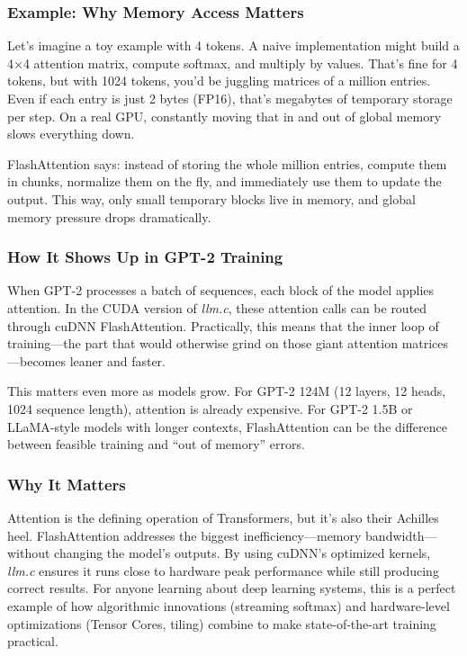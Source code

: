 \documentclass[
  letterpaper,
  DIV=11,
  numbers=noendperiod]{scrreprt}
\begin{document}
\subsubsection{Example: Why Memory Access
Matters}\label{example-why-memory-access-matters}

Let's imagine a toy example with 4 tokens. A naive implementation might
build a 4×4 attention matrix, compute softmax, and multiply by values.
That's fine for 4 tokens, but with 1024 tokens, you'd be juggling
matrices of a million entries. Even if each entry is just 2 bytes
(FP16), that's megabytes of temporary storage per step. On a real GPU,
constantly moving that in and out of global memory slows everything
down.

FlashAttention says: instead of storing the whole million entries,
compute them in chunks, normalize them on the fly, and immediately use
them to update the output. This way, only small temporary blocks live in
memory, and global memory pressure drops dramatically.

\subsubsection{How It Shows Up in GPT-2
Training}\label{how-it-shows-up-in-gpt-2-training}

When GPT-2 processes a batch of sequences, each block of the model
applies attention. In the CUDA version of \emph{llm.c}, these attention
calls can be routed through cuDNN FlashAttention. Practically, this
means that the inner loop of training---the part that would otherwise
grind on those giant attention matrices---becomes leaner and faster.

This matters even more as models grow. For GPT-2 124M (12 layers, 12
heads, 1024 sequence length), attention is already expensive. For GPT-2
1.5B or LLaMA-style models with longer contexts, FlashAttention can be
the difference between feasible training and ``out of memory'' errors.

\subsubsection{Why It Matters}\label{why-it-matters-39}

Attention is the defining operation of Transformers, but it's also their
Achilles heel. FlashAttention addresses the biggest
inefficiency---memory bandwidth---without changing the model's outputs.
By using cuDNN's optimized kernels, \emph{llm.c} ensures it runs close
to hardware peak performance while still producing correct results. For
anyone learning about deep learning systems, this is a perfect example
of how algorithmic innovations (streaming softmax) and hardware-level
optimizations (Tensor Cores, tiling) combine to make state-of-the-art
training practical.
\end{document}
